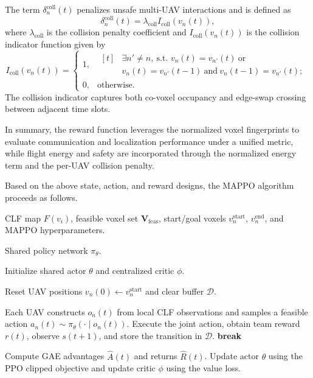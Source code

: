\documentclass[lettersize,journal]{IEEEtran}
\begin{document}
The term $\delta_n^{\mathrm{coll}}(t)$ penalizes unsafe multi-UAV interactions and is defined as
\begin{equation}
\delta_n^{\mathrm{coll}}(t)=\lambda_{\mathrm{coll}}I_{\mathrm{coll}}(v_n(t)),
\end{equation}
where $\lambda_{\mathrm{coll}}$ is the collision penalty coefficient and $I_{\mathrm{coll}}(v_n(t))$ is the collision indicator function given by
\begin{equation}
I_{\mathrm{coll}}(v_n(t))=
\begin{cases}
1, &\begin{aligned}[t]
&\exists n'\neq n,\ \text{s.t. }v_n(t)=v_{n'}(t)\ \text{or}\\
&v_n(t)=v_{n'}(t-1)\ \text{and}\ v_n(t-1)=v_{n'}(t);
\end{aligned}\\
0, & \mathrm{otherwise}.
\end{cases}
\end{equation}
The collision indicator captures both co-voxel occupancy and edge-swap crossing between adjacent time slots.

In summary, the reward function leverages the normalized voxel fingerprints to evaluate communication and localization performance under a unified metric, while flight energy and safety are incorporated through the normalized energy term and the per-UAV collision penalty.

Based on the above state, action, and reward designs, the MAPPO algorithm proceeds as follows.

\begin{algorithm}[!t]
\caption{CLF-Aided Multi-UAV Trajectory Planning via MAPPO}
\label{alg:clf_mappo}
\scriptsize
\begin{algorithmic}
\REQUIRE CLF map $F(v_i)$, feasible voxel set $\mathbf{V}_{\mathrm{feas}}$,
start/goal voxels $v_n^{\mathrm{start}}$, $v_n^{\mathrm{end}}$,
and MAPPO hyperparameters.

\ENSURE Shared policy network $\pi_{\theta}$.

\STATE Initialize shared actor $\theta$ and centralized critic $\phi$.

\REPEAT
    \STATE Reset UAV positions $v_n(0)\leftarrow v_n^{\mathrm{start}}$ and clear buffer $\mathcal{D}$.

        \STATE Each UAV constructs $o_n(t)$ from local CLF observations and samples a feasible action
        $a_n(t)\sim\pi_{\theta}(\cdot\mid o_n(t))$.
        \STATE Execute the joint action, obtain team reward $r(t)$, observe $s(t+1)$, and store the transition in $\mathcal{D}$.
            \STATE \textbf{break}
        \ENDIF
    \ENDFOR

    \STATE Compute GAE advantages $\hat{A}(t)$ and returns $\hat{R}(t)$.
    \STATE Update actor $\theta$ using the PPO clipped objective and update critic $\phi$ using the value loss.

\end{algorithmic}
\end{algorithm}
\end{document}
